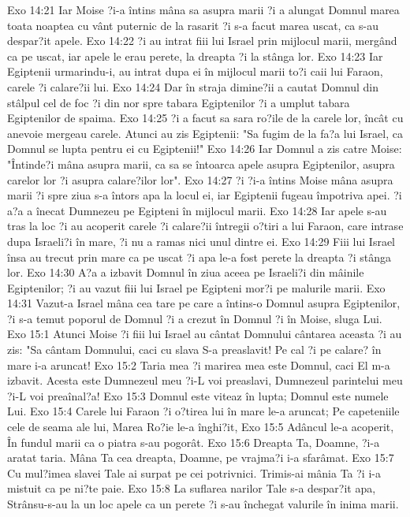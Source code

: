 Exo 14:21  Iar Moise ?i-a întins mâna sa asupra marii ?i a alungat Domnul marea toata noaptea cu vânt puternic de la rasarit ?i s-a facut marea uscat, ca s-au despar?it apele.
Exo 14:22  ?i au intrat fiii lui Israel prin mijlocul marii, mergând ca pe uscat, iar apele le erau perete, la dreapta ?i la stânga lor.
Exo 14:23  Iar Egiptenii urmarindu-i, au intrat dupa ei în mijlocul marii to?i caii lui Faraon, carele ?i calare?ii lui.
Exo 14:24  Dar în straja dimine?ii a cautat Domnul din stâlpul cel de foc ?i din nor spre tabara Egiptenilor ?i a umplut tabara Egiptenilor de spaima.
Exo 14:25  ?i a facut sa sara ro?ile de la carele lor, încât cu anevoie mergeau carele. Atunci au zis Egiptenii: "Sa fugim de la fa?a lui Israel, ca Domnul se lupta pentru ei cu Egiptenii!"
Exo 14:26  Iar Domnul a zis catre Moise: "Întinde?i mâna asupra marii, ca sa se întoarca apele asupra Egiptenilor, asupra carelor lor ?i asupra calare?ilor lor".
Exo 14:27  ?i ?i-a întins Moise mâna asupra marii ?i spre ziua s-a întors apa la locul ei, iar Egiptenii fugeau împotriva apei. ?i a?a a înecat Dumnezeu pe Egipteni în mijlocul marii.
Exo 14:28  Iar apele s-au tras la loc ?i au acoperit carele ?i calare?ii întregii o?tiri a lui Faraon, care intrase dupa Israeli?i în mare, ?i nu a ramas nici unul dintre ei.
Exo 14:29  Fiii lui Israel însa au trecut prin mare ca pe uscat ?i apa le-a fost perete la dreapta ?i stânga lor.
Exo 14:30  A?a a izbavit Domnul în ziua aceea pe Israeli?i din mâinile Egiptenilor; ?i au vazut fiii lui Israel pe Egipteni mor?i pe malurile marii.
Exo 14:31  Vazut-a Israel mâna cea tare pe care a întins-o Domnul asupra Egiptenilor, ?i s-a temut poporul de Domnul ?i a crezut în Domnul ?i în Moise, sluga Lui.
Exo 15:1  Atunci Moise ?i fiii lui Israel au cântat Domnului cântarea aceasta ?i au zis: "Sa cântam Domnului, caci cu slava S-a preaslavit! Pe cal ?i pe calare? în mare i-a aruncat!
Exo 15:2  Taria mea ?i marirea mea este Domnul, caci El m-a izbavit. Acesta este Dumnezeul meu ?i-L voi preaslavi, Dumnezeul parintelui meu ?i-L voi preaînal?a!
Exo 15:3  Domnul este viteaz în lupta; Domnul este numele Lui.
Exo 15:4  Carele lui Faraon ?i o?tirea lui în mare le-a aruncat; Pe capeteniile cele de seama ale lui, Marea Ro?ie le-a înghi?it,
Exo 15:5  Adâncul le-a acoperit, În fundul marii ca o piatra s-au pogorât.
Exo 15:6  Dreapta Ta, Doamne, ?i-a aratat taria. Mâna Ta cea dreapta, Doamne, pe vrajma?i i-a sfarâmat.
Exo 15:7  Cu mul?imea slavei Tale ai surpat pe cei potrivnici. Trimis-ai mânia Ta ?i i-a mistuit ca pe ni?te paie.
Exo 15:8  La suflarea narilor Tale s-a despar?it apa, Strânsu-s-au la un loc apele ca un perete ?i s-au închegat valurile în inima marii.
